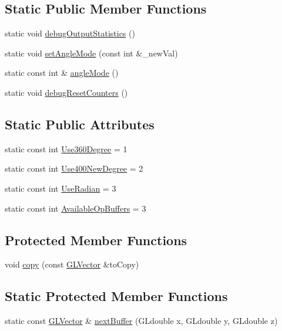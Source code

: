 \subsection*{\-Static \-Public \-Member \-Functions}
\begin{DoxyCompactItemize}
\item 
static void \hyperlink{classGLVector_add2a39dc176e05b68c02375fb674820e}{debug\-Output\-Statistics} ()
\item 
static void \hyperlink{classGLVector_ada6be0eae6a2a3f201854bcf973cfc6f}{set\-Angle\-Mode} (const int \&\-\_\-new\-Val)
\item 
static const int \& \hyperlink{classGLVector_ab697a8814c499f9924c9340d74f02e12}{angle\-Mode} ()
\item 
static void \hyperlink{classGLVector_a7e54a0a197b0f4cab2b848fd7e9e74d8}{debug\-Reset\-Counters} ()
\end{DoxyCompactItemize}
\subsection*{\-Static \-Public \-Attributes}
\begin{DoxyCompactItemize}
\item 
static const int \hyperlink{classGLVector_abb139fb8951c3eda14b0eb7d74c0504e}{\-Use360\-Degree} = 1
\item 
static const int \hyperlink{classGLVector_a4ee1d6d06257b4e5399ad196eb6db536}{\-Use400\-New\-Degree} = 2
\item 
static const int \hyperlink{classGLVector_a8b1fc370c56a13540109b9b6f3d4f5df}{\-Use\-Radian} = 3
\item 
static const int \hyperlink{classGLVector_a6993a627d920674f67b9a616ff2e931f}{\-Available\-Op\-Buffers} = 3
\end{DoxyCompactItemize}
\subsection*{\-Protected \-Member \-Functions}
\begin{DoxyCompactItemize}
\item 
void \hyperlink{classGLVector_a61f9f40992082292e73190c59b1f95cd}{copy} (const \hyperlink{classGLVector}{\-G\-L\-Vector} \&to\-Copy)
\end{DoxyCompactItemize}
\subsection*{\-Static \-Protected \-Member \-Functions}
\begin{DoxyCompactItemize}
\item 
static const \hyperlink{classGLVector}{\-G\-L\-Vector} \& \hyperlink{classGLVector_a5705bc9163f6d6a8f67ad8af7e5ef22c}{next\-Buffer} (\-G\-Ldouble x, \-G\-Ldouble y, \-G\-Ldouble z)
\end{DoxyCompactItemize}
